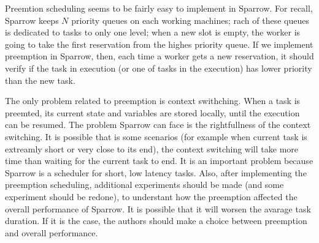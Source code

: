 \documentclass[11pt]{article}
\begin{document}
		Preemtion scheduling seems to be fairly easy to implement in Sparrow. For recall, Sparrow keeps $N$ priority queues on each working machines; rach of these queues is dedicated to tasks to only one level; when a new slot is empty, the worker is going to take the first reservation from the highes priority queue. If we implement preemption in Sparrow, then, each time a worker gets a new reservation, it should verify if the task in execution (or one of tasks in the execution) has lower priority than the new task.
		
		The only problem related to preemption is context swithching. When a task is preemted, its current state and variables are stored locally, until the execution can be resumed. The problem Sparrow can face is the rightfullness of the context switching. It is possible that is some scenarios (for example when current task is extreamly short or very close to its end), the context switching will take more time than waiting for the current task to end. It is an important problem because Sparrow is a scheduler for short, low latency tasks. Also, after implementing the preemption scheduling, additional experiments should be made (and some experiment should be redone), to understant how the preemption affected the overall performance of Sparrow. It is possible that it will worsen the avarage task duration. If it is the case, the authors should make a choice between preemption and overall performance.
		
		
		
			
		
\end{document}
